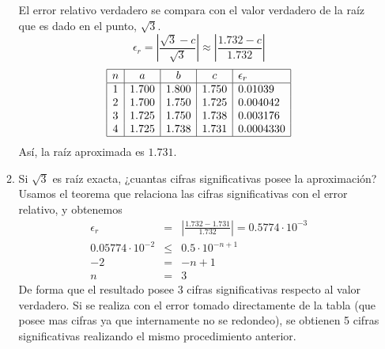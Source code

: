 \documentclass[12pt]{article}
\begin{document}
\begin{enumerate}[leftmargin=*,widest=9]
\begin{enumerate}[label=\alph*]
    El error relativo verdadero se compara con el valor verdadero de la raíz que es dado en el punto, $\sqrt{3}$.
    \[ \epsilon_r = \left| \frac{\sqrt{3} - c}{\sqrt{3}} \right| \approx \left|\frac{1.732 - c}{1.732} \right| \]
    \[
    \begin{array}{|c|c|c|c|l|}
    \hline
    n & a & b & c & \epsilon_r \\
    \hline
    1  & 1.700  & 1.800 & 1.750  & 0.01039\\
    2 &  1.700 & 1.750 & 1.725 & 0.004042\\
    3 & 1.725 & 1.750 & 1.738 & 0.003176\\
    4 & 1.725 & 1.738 & 1.731 & 0.0004330 \\
    \hline
    \end{array}
    \]
    Así, la raíz aproximada es $1.731$.
    \item Si $\sqrt{3}$ es raíz exacta, ¿cuantas cifras significativas posee la aproximación?
    Usamos el teorema que relaciona las cifras significativas con el error relativo, y obtenemos
    \begin{eqnarray*}
    \epsilon_r  & = & \left| \frac{1.732 - 1.731}{1.732} \right| = 0.5774\cdot 10^{-3}  \\
    0.05774\cdot 10^{-2} & \leq & 0.5 \cdot 10^{-n + 1} \\
    -2 & = & -n + 1 \\
    n & = & 3
    \end{eqnarray*}
    De forma que el resultado posee 3 cifras significativas respecto al valor verdadero. Si se realiza con el error tomado directamente de la tabla (que posee mas cifras ya que internamente no se redondeo), se obtienen 5 cifras significativas realizando el mismo procedimiento anterior.
    \end{enumerate}
  \end{enumerate}
\end{document}
